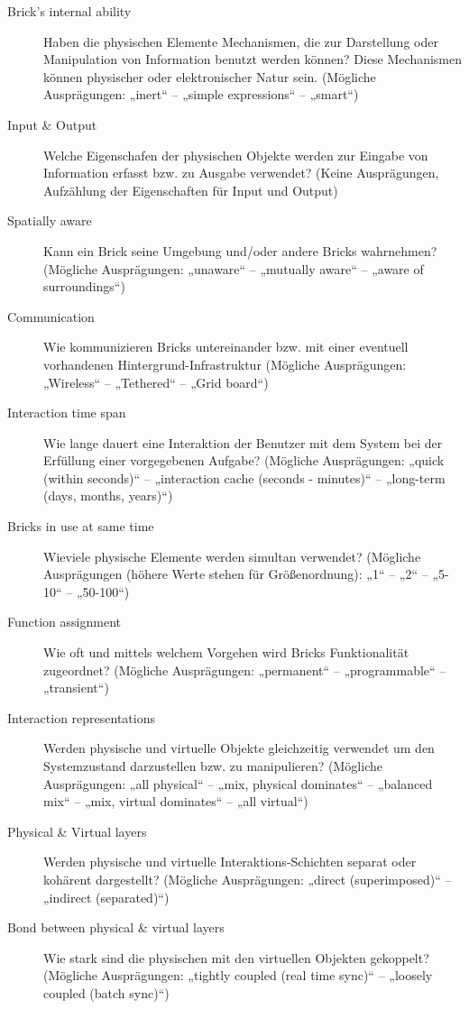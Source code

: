 \begin{description}
	\item[Brick's internal ability] Haben die physischen Elemente Mechanismen, die zur Darstellung oder Manipulation von Information benutzt werden können? Diese Mechanismen können physischer oder elektronischer Natur sein. (Mögliche Ausprägungen: „inert“ -- „simple expressions“ -- „smart“) 
	\item[Input \& Output] Welche Eigenschafen der physischen Objekte werden zur Eingabe von Information erfasst bzw. zu Ausgabe verwendet? (Keine Ausprägungen, Aufzählung der Eigenschaften für Input und Output)
	\item[Spatially aware] Kann ein Brick seine Umgebung und/oder andere Bricks wahrnehmen? (Mögliche Ausprägungen: „unaware“ -- „mutually aware“ -- „aware of surroundings“) 
	\item[Communication] Wie kommunizieren Bricks untereinander bzw. mit einer eventuell vorhandenen Hintergrund-Infrastruktur (Mögliche Ausprägungen: „Wireless“ -- „Tethered“ -- „Grid board“)
	\item[Interaction time span] Wie lange dauert eine Interaktion der Benutzer mit dem System bei der Erfüllung einer vorgegebenen Aufgabe? (Mögliche Ausprägungen: „quick (within seconds)“ -- „interaction cache (seconds - minutes)“ -- „long-term (days, months, years)“)
	\item[Bricks in use at same time] Wieviele physische Elemente werden simultan verwendet? (Mögliche Ausprägungen (höhere Werte stehen für Größenordnung): „1“ -- „2“ -- „5-10“ -- „50-100“)
	\item[Function assignment] Wie oft und mittels welchem Vorgehen wird Bricks Funktionalität zugeordnet? (Mögliche Ausprägungen: „permanent“ -- „programmable“ -- „transient“) 
	\item[Interaction representations] Werden physische und virtuelle Objekte gleichzeitig verwendet um den Systemzustand darzustellen bzw. zu manipulieren? (Mögliche Ausprägungen: „all physical“ -- „mix, physical dominates“ -- „balanced mix“ -- „mix, virtual dominates“ -- „all virtual“)
	\item[Physical \& Virtual layers] Werden physische und virtuelle Interaktions-Schichten separat oder kohärent dargestellt? (Mögliche Ausprägungen: „direct (superimposed)“ -- „indirect (separated)“)
	\item[Bond between physical \& virtual layers] Wie stark sind die physischen mit den virtuellen Objekten gekoppelt? (Mögliche Ausprägungen: „tightly coupled (real time sync)“ -- „loosely coupled (batch sync)“)

\end{description}
